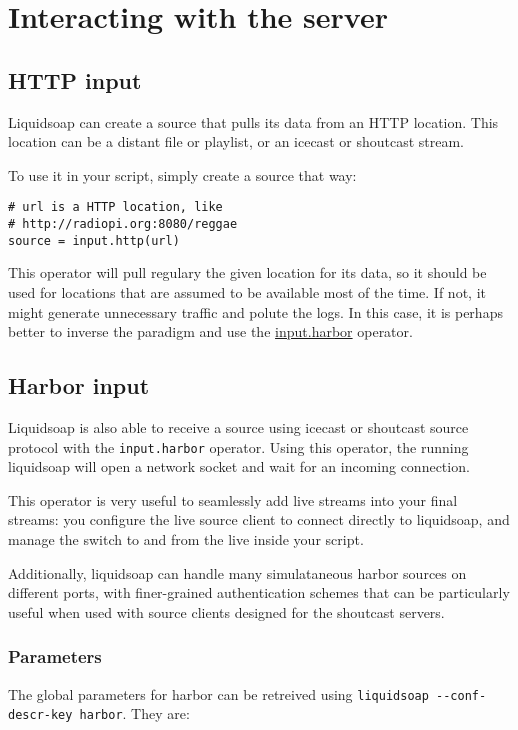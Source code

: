 \chapter{Interacting with the server}
\section{HTTP input}
Liquidsoap can create a source that pulls its data from an HTTP location. This location can 
be a distant file or playlist, or an icecast or shoutcast stream.

To use it in your script, simply create a source that way:

\begin{verbatim}
# url is a HTTP location, like
# http://radiopi.org:8080/reggae
source = input.http(url)
\end{verbatim}
This operator will pull regulary the given location for its data, so it should be used for 
locations that are assumed to be available most of the time. If not, it might generate unnecessary 
traffic and polute the logs. In this case, it is perhaps better to inverse the paradigm and 
use the \href{harbor.html}{input.harbor} operator.

\section{Harbor input}
Liquidsoap is also able to receive a source using icecast or shoutcast source protocol with 
the \verb+input.harbor+ operator. Using this operator, the running liquidsoap will open 
a network socket and wait for an incoming connection.

This operator is very useful to seamlessly add live streams
into your final streams:
you configure the live source client to connect directly to liquidsoap,
and manage the switch to and from the live inside your script.

Additionally, liquidsoap can handle many simulataneous harbor sources on different ports, 
with finer-grained authentication schemes that can be particularly useful when used with
source clients designed for the shoutcast servers.

\subsection{Parameters}
The global parameters for harbor can be retreived using
\verb+liquidsoap --conf-descr-key harbor+. They are:

